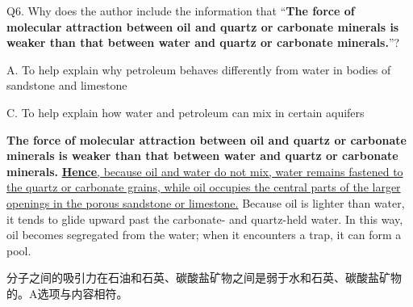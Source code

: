 \begin{blk}
    \begin{qst}
        Q6. Why does the author include the information that “\textbf{The force of molecular attraction between oil and quartz or carbonate minerals is weaker than that between water and quartz or carbonate minerals.}”?
    \end{qst}

    \begin{chc}
        A. To help explain why petroleum behaves differently from water in bodies of sandstone and limestone

        C. To help explain how water and petroleum can mix in certain aquifers
    \end{chc}

    \begin{psgq}
        \textbf{The force of molecular attraction between oil and quartz or carbonate minerals is weaker than that between water and quartz or carbonate minerals.} \ul{\textbf{Hence}, because oil and water do not mix, water remains fastened to the quartz or carbonate grains, while oil occupies the central parts of the larger openings in the porous sandstone or limestone.} Because oil is lighter than water, it tends to glide upward past the carbonate- and quartz-held water. In this way, oil becomes segregated from the water; when it encounters a trap, it can form a pool.
    \end{psgq}

    \begin{nlz}
        分子之间的吸引力在石油和石英、碳酸盐矿物之间是弱于水和石英、碳酸盐矿物的。A选项与内容相符。
    \end{nlz}
\end{blk}
